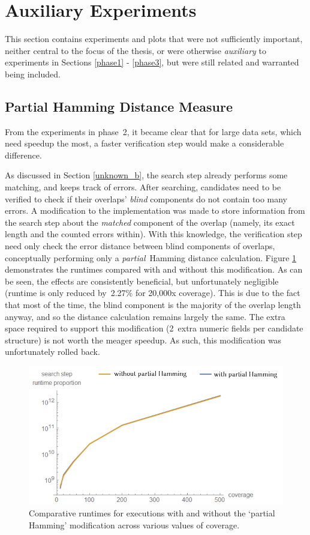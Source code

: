\section{Auxiliary Experiments}
\label{phase_aux}

This section contains experiments and plots that were not sufficiently important, neither central to the focus of the thesis, or were otherwise \textit{auxiliary} to experiments in Sections \ref{phase1} - \ref{phase3}, but were still related and warranted being included.

\subsection{Partial Hamming Distance Measure}

From the experiments in phase~2, it became clear that for large data sets, which need speedup the most, a faster \gls{verification step} would make a considerable difference.

As discussed in Section \ref{unknown_b}, the \gls{search step} already performs some matching, and keeps track of \glspl{error}. After searching, \glspl{candidate} need to be verified to check if their overlaps' \textit{blind} components do not contain too many errors. A modification to the implementation was made to store information from the search step about the \textit{matched} component of the overlap (namely, its exact length and the counted errors within). With this knowledge, the verification step need only check the \gls{error distance} between blind components of overlaps, conceptually performing only a \textit{partial}~\gls{Hamming distance} calculation. Figure \ref{fig:partial_hamming} demonstrates the runtimes compared with and without this modification. As can be seen, the effects are consistently beneficial, but unfortunately negligible (runtime is only reduced by~2.27\% for 20,000x coverage). This is due to the fact that most of the time, the blind component is the majority of the overlap length anyway, and so the distance calculation remains largely the same. The extra space required to support this modification (2~extra numeric fields per \gls{candidate} structure) is not worth the meager speedup. As such, this modification was unfortunately rolled back.


\begin{figure}[!htb]
\centering
\includegraphics[width=.8\textwidth]{images/partial_hamming.png}
\caption{Comparative runtimes for executions with and without the `partial Hamming' modification across various values of coverage.}
\label{fig:partial_hamming}
\end{figure}

